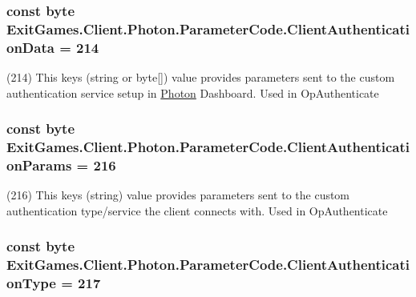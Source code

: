 \subsubsection[{\texorpdfstring{Client\+Authentication\+Data}{ClientAuthenticationData}}]{\setlength{\rightskip}{0pt plus 5cm}const byte Exit\+Games.\+Client.\+Photon.\+Parameter\+Code.\+Client\+Authentication\+Data = 214}\hypertarget{class_exit_games_1_1_client_1_1_photon_1_1_parameter_code_a02245ae597165f8efbdc27cdc2465521}{}\label{class_exit_games_1_1_client_1_1_photon_1_1_parameter_code_a02245ae597165f8efbdc27cdc2465521}


(214) This key\textquotesingle{}s (string or byte\mbox{[}\mbox{]}) value provides parameters sent to the custom authentication service setup in \hyperlink{namespace_exit_games_1_1_client_1_1_photon}{Photon} Dashboard. Used in Op\+Authenticate

\subsubsection[{\texorpdfstring{Client\+Authentication\+Params}{ClientAuthenticationParams}}]{\setlength{\rightskip}{0pt plus 5cm}const byte Exit\+Games.\+Client.\+Photon.\+Parameter\+Code.\+Client\+Authentication\+Params = 216}\hypertarget{class_exit_games_1_1_client_1_1_photon_1_1_parameter_code_aa038563acd329dd1ec796bc3dbda94ed}{}\label{class_exit_games_1_1_client_1_1_photon_1_1_parameter_code_aa038563acd329dd1ec796bc3dbda94ed}


(216) This key\textquotesingle{}s (string) value provides parameters sent to the custom authentication type/service the client connects with. Used in Op\+Authenticate

\subsubsection[{\texorpdfstring{Client\+Authentication\+Type}{ClientAuthenticationType}}]{\setlength{\rightskip}{0pt plus 5cm}const byte Exit\+Games.\+Client.\+Photon.\+Parameter\+Code.\+Client\+Authentication\+Type = 217}\hypertarget{class_exit_games_1_1_client_1_1_photon_1_1_parameter_code_aced7dd5821acb92b52696d064e19714b}{}\label{class_exit_games_1_1_client_1_1_photon_1_1_parameter_code_aced7dd5821acb92b52696d064e19714b}


